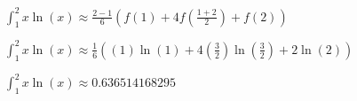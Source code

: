 \documentclass[english,notitlepage,letterpaper, 10pt]{article} %
\begin{document}
\begin{enumerate}[a)]
\begin{center}
    \begin{math}
      \displaystyle \int_1^2 x\ln(x) \approx \frac{2-1}{6} \left( f(1) + 4 f \left( \frac{1+2}{2} \right)  + f(2) \right)
    \end{math}

    \begin{math}
      \displaystyle \int_1^2 x\ln(x) \approx \frac{1}{6} \left( (1)\ln(1) + 4 \left( \frac{3}{2} \right)  \ln\left( \frac{3}{2} \right) + 2\ln(2) \right)
    \end{math}

    \begin{math}
      \displaystyle \int_1^2 x\ln(x) \approx 0.636514168295
    \end{math}
  \end{center}
  
\end{enumerate}
\end{document}
